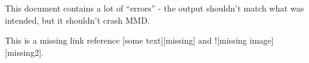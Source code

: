 
\def\mytitle{MultiMarkdown Error Test}

This document contains a lot of ``errors'' - the output shouldn't match what was intended, but it shouldn't crash MMD.

This is a missing link reference [some text][missing] and ![missing image][missing2].




